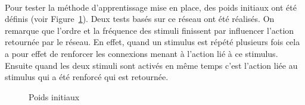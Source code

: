 \paragraph{}
Pour tester la méthode d'apprentissage mise en place, des poids initiaux ont
été définis (voir Figure~\ref{reseau3}). Deux tests basés sur ce réseau ont
été réalisés. On remarque que l'ordre et la fréquence des stimuli finissent par
influencer l'action retournée par le réseau. En effet, quand un stimulus est
répété plusieurs fois cela a pour effet de renforcer les connexions 
menant à l'action lié à ce stimulus. Ensuite quand les deux stimuli sont 
activés en même temps c'est l'action liée au stimulus qui a été renforcé qui
est retournée.
\begin{figure}[!h]
  \begin{center}
    
  \end{center}
  \caption{Poids initiaux}
  \label{reseau3}
\end{figure}


